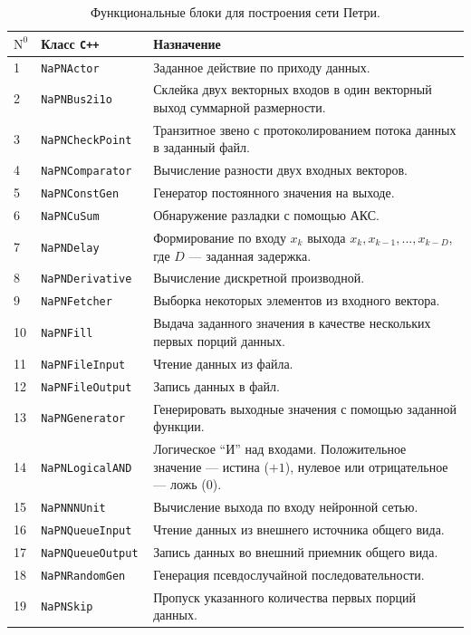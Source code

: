\begin{table}
\centering
\caption{Функциональные блоки для построения сети Петри.}
\label{tabl:pn_objects}
\begin{tabular}{|l|l|p{11.5cm}|}
\hline
$\mathrm N^0$ & Класс \tt C++ & Назначение \\
\hline
1  & \tt NaPNActor & Заданное действие по приходу данных. \\
2  & \tt NaPNBus2i1o & Склейка двух векторных входов в один векторный выход суммарной размерности. \\
3  & \tt NaPNCheckPoint & Транзитное звено с протоколированием потока данных в заданный файл. \\
4  & \tt NaPNComparator & Вычисление разности двух входных векторов. \\
5  & \tt NaPNConstGen & Генератор постоянного значения на выходе. \\
6  & \tt NaPNCuSum & Обнаружение разладки с помощью АКС. \\
7  & \tt NaPNDelay & Формирование по входу $x_k$ выхода $x_k,x_{k-1},...,x_{k-D}$, где $D$ --- заданная задержка. \\
8  & \tt NaPNDerivative & Вычисление дискретной производной. \\
9  & \tt NaPNFetcher & Выборка некоторых элементов из входного вектора. \\
10 & \tt NaPNFill & Выдача заданного значения в качестве нескольких первых порций данных. \\
11 & \tt NaPNFileInput & Чтение данных из файла. \\
12 & \tt NaPNFileOutput & Запись данных в файл. \\
13 & \tt NaPNGenerator & Генерировать выходные значения с помощью заданной функции. \\
14 & \tt NaPNLogicalAND & Логическое ``И'' над входами.  Положительное значение --- истина ($+1$), нулевое или отрицательное --- ложь ($0$). \\
15 & \tt NaPNNNUnit & Вычисление выхода по входу нейронной сетью. \\
16 & \tt NaPNQueueInput & Чтение данных из внешнего источника общего вида. \\
17 & \tt NaPNQueueOutput & Запись данных во внешний приемник общего вида. \\
18 & \tt NaPNRandomGen & Генерация псевдослучайной последовательности. \\
19 & \tt NaPNSkip & Пропуск указанного количества первых порций данных. \\

\end{tabular}
\end{table}
